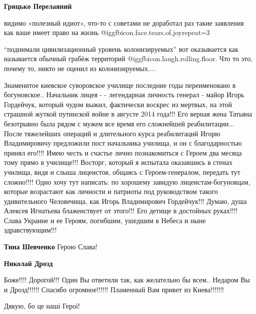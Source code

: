 \begin{itemize}
\begin{itemize}
\begin{itemize}
\textbf{Грицько Перелаяний} 

видимо «полезный идиот», что-то с советами не доработал раз такие заявления как
ваше имеет право на жизнь @igg{fbicon.face.tears.of.joy}{repeat=3} 


\enquote{поднимали цивилизационный уровень колонизируемых} вот оказывается как
называется обычный грабёж территорий  @igg{fbicon.laugh.rolling.floor}. Что то
это, почему то, никто не оценил
из колонизируемых....

\end{itemize} %

\end{itemize} %


Знаменитое киевское суворовское училище последние годы переименовано в
богуновское.. Начальник лицея - - легендарная личность генерал - майор Игорь
Гордейчук, который чудом выжил, фактически воскрес из мертвых, на этой страшной
жуткой путинской войне в августе 2014 года!!! Его верная жена Татьяна
безотрывно была рядом с мужем все время его сложнейшей реабилитации... После
тяжелейших операций и длительного курса реабилитаций Игорю Владимировичу
предложили пост начальника училища, и он с благодарностью принял его!!!! Имею
честь и счастье лично познакомиться с Героем два месяца тому прямо в училище!!!
Восторг, который я испытала оказавшись в стенах училища, видя и слыша
лицеистов, общаясь с Героем-генералом, передать тут сложно!!!! Одно хочу тут
написать: по хорошему завидую лицеистам-богуновцам, которые возрастают как
личности и патриоты под руководством такого удивительного Человечища, как Игорь
Владимирович Гордейчук!!! Думаю, душа Алексея Игнатьева блаженствует от этого!!!
Его детище в достойных руках!!!! Слава Украине и ее Героям, погибшим, ушедшим в
Небеса и ныне здравствующим!!!

\begin{itemize} %
\textbf{Тина Шевченко} Герою Слава!

\begin{itemize} %
\textbf{Николай Дрозд} 

Боже!!!! Дорогой!!! Один Вы ответили так, как желательно бы всем.. Недаром Вы и
Дрозд!!!!!! Спасибо огромное!!!!!! Пламенный Вам привет из Киева!!!!!!!

Дякую, бо це наші Герої!
\end{itemize} %


\end{itemize}
\end{itemize}
